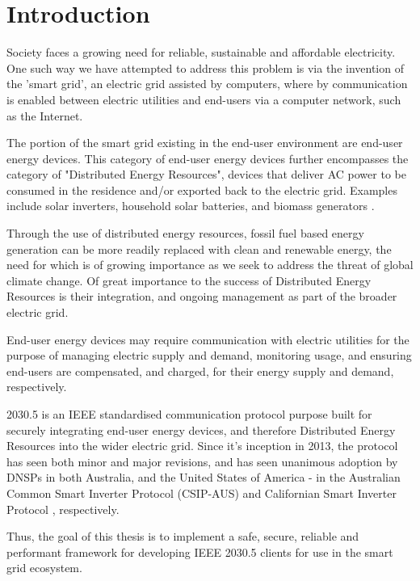 \chapter{Introduction}\label{ch:intro}
Society faces a growing need for reliable, sustainable and affordable electricity. One such way we have attempted to address this problem is via the invention of the 'smart grid', an electric grid assisted by computers, where by communication is enabled between electric utilities and end-users via a computer network, such as the Internet.

The portion of the smart grid existing in the end-user environment are end-user energy devices.
This category of end-user energy devices further encompasses the category of "Distributed Energy Resources", devices that deliver AC power to be consumed in the residence and/or exported back to the electric grid. Examples include solar inverters, household solar batteries, and biomass generators \cite{IEEE2030.5}. 

Through the use of distributed energy resources, fossil fuel based energy generation can be more readily replaced with clean and renewable energy, the need for which is of growing importance as we seek to address the threat of global climate change. Of great importance to the success of Distributed Energy Resources is their integration, and ongoing management as part of the broader electric grid.

End-user energy devices may require communication with electric utilities for the purpose of managing electric supply and demand, monitoring usage, and ensuring end-users are compensated, and charged, for their energy supply and demand, respectively.

2030.5 is an IEEE standardised communication protocol purpose built for securely integrating end-user energy devices, and therefore Distributed Energy Resources into the wider electric grid. Since it's inception in 2013, the protocol has seen both minor and major revisions, and has seen unanimous adoption by DNSPs in both Australia, and the United States of America - in the Australian Common Smart Inverter Protocol (CSIP-AUS) \cite{CSIPAus} and Californian Smart Inverter Protocol \cite{CalAdoption}, respectively.

Thus, the goal of this thesis is to implement a safe, secure, reliable and performant framework for developing IEEE 2030.5 clients for use in the smart grid ecosystem. 